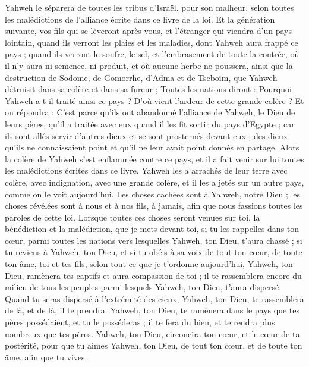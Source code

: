 \begin{multicols}{2}
Yahweh le séparera de toutes les tribus d'Israël, pour son malheur, selon toutes les malédictions de l'alliance écrite dans ce livre de la loi.
Et la génération suivante, vos fils qui se lèveront après vous, et l'étranger qui viendra d'un pays lointain, quand ils verront les plaies et les maladies, dont Yahweh aura frappé ce pays ;
quand ils verront le soufre, le sel, et l'embrasement de toute la contrée, où il n'y aura ni semence, ni produit, et où aucune herbe ne poussera, ainsi que la destruction de Sodome, de Gomorrhe, d'Adma et de Tseboïm, que Yahweh détruisit dans sa colère et dans sa fureur ;
Toutes les nations diront : Pourquoi Yahweh a-t-il traité ainsi ce pays ? D'où vient l'ardeur de cette grande colère ?
Et on répondra : C'est parce qu'ils ont abandonné l'alliance de Yahweh, le Dieu de leurs pères, qu'il a traitée avec eux quand il les fit sortir du pays d'Egypte ;
car ils sont allés servir d'autres dieux et se sont prosternés devant eux ; des dieux qu'ils ne connaissaient point et qu'il ne leur avait point donnés en partage.
Alors la colère de Yahweh s'est enflammée contre ce pays, et il a fait venir sur lui toutes les malédictions écrites dans ce livre.
Yahweh les a arrachés de leur terre avec colère, avec indignation, avec une grande colère, et il les a jetés sur un autre pays, comme on le voit aujourd'hui.
Les choses cachées sont à Yahweh, notre Dieu ; les choses révélées sont à nous et à nos fils, à jamais, afin que nous fassions toutes les paroles de cette loi.
\VerseOne{}Lorsque toutes ces choses seront venues sur toi, la bénédiction et la malédiction, que je mets devant toi, si tu les rappelles dans ton cœur, parmi toutes les nations vers lesquelles Yahweh, ton Dieu, t'aura chassé ;
si tu reviens à Yahweh, ton Dieu, et si tu obéis à sa voix de tout ton cœur, de toute ton âme, toi et tes fils, selon tout ce que je t'ordonne aujourd'hui,
Yahweh, ton Dieu, ramènera tes captifs et aura compassion de toi ; il te rassemblera encore du milieu de tous les peuples parmi lesquels Yahweh, ton Dieu, t'aura dispersé.
Quand tu seras dispersé à l'extrémité des cieux, Yahweh, ton Dieu, te rassemblera de là, et de là, il te prendra.
Yahweh, ton Dieu, te ramènera dans le pays que tes pères possédaient, et tu le posséderas ; il te fera du bien, et te rendra plus nombreux que tes pères.
Yahweh, ton Dieu, circoncira ton cœur, et le cœur de ta postérité, pour que tu aimes Yahweh, ton Dieu, de tout ton cœur, et de toute ton âme, afin que tu vives.

\end{multicols}
